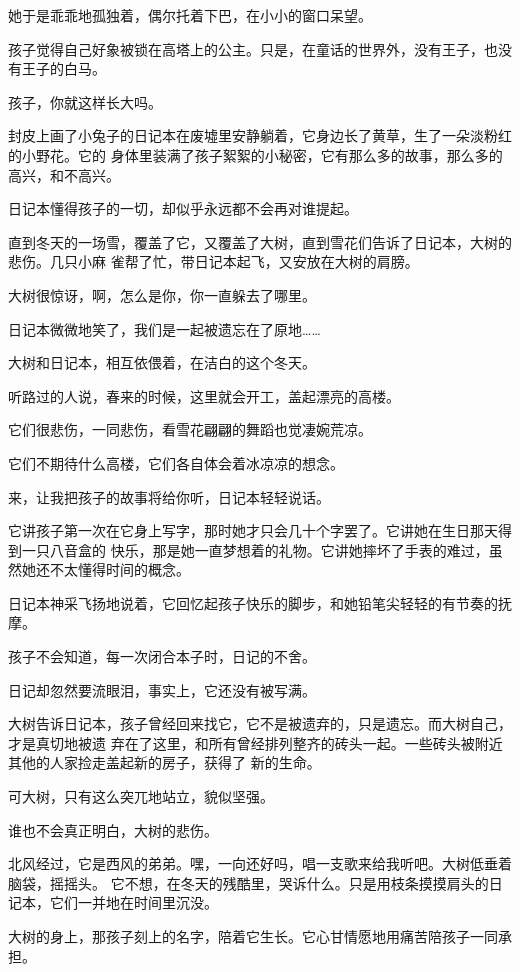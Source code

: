 		她于是乖乖地孤独着，偶尔托着下巴，在小小的窗口呆望。

		孩子觉得自己好象被锁在高塔上的公主。只是，在童话的世界外，没有王子，也没有王子的白马。


		孩子，你就这样长大吗。

		封皮上画了小兔子的日记本在废墟里安静躺着，它身边长了黄草，生了一朵淡粉红的小野花。它的
	身体里装满了孩子絮絮的小秘密，它有那么多的故事，那么多的高兴，和不高兴。

		日记本懂得孩子的一切，却似乎永远都不会再对谁提起。

		直到冬天的一场雪，覆盖了它，又覆盖了大树，直到雪花们告诉了日记本，大树的悲伤。几只小麻
	雀帮了忙，带日记本起飞，又安放在大树的肩膀。

		大树很惊讶，啊，怎么是你，你一直躲去了哪里。

		日记本微微地笑了，我们是一起被遗忘在了原地……

		大树和日记本，相互依偎着，在洁白的这个冬天。

		听路过的人说，春来的时候，这里就会开工，盖起漂亮的高楼。


		它们很悲伤，一同悲伤，看雪花翩翩的舞蹈也觉凄婉荒凉。

		它们不期待什么高楼，它们各自体会着冰凉凉的想念。


		来，让我把孩子的故事将给你听，日记本轻轻说话。

		它讲孩子第一次在它身上写字，那时她才只会几十个字罢了。它讲她在生日那天得到一只八音盒的
	快乐，那是她一直梦想着的礼物。它讲她摔坏了手表的难过，虽然她还不太懂得时间的概念。

		日记本神采飞扬地说着，它回忆起孩子快乐的脚步，和她铅笔尖轻轻的有节奏的抚摩。

		孩子不会知道，每一次闭合本子时，日记的不舍。

		日记却忽然要流眼泪，事实上，它还没有被写满。

		大树告诉日记本，孩子曾经回来找它，它不是被遗弃的，只是遗忘。而大树自己，才是真切地被遗
	弃在了这里，和所有曾经排列整齐的砖头一起。一些砖头被附近其他的人家捡走盖起新的房子，获得了
	新的生命。

		可大树，只有这么突兀地站立，貌似坚强。

		谁也不会真正明白，大树的悲伤。


		北风经过，它是西风的弟弟。嘿，一向还好吗，唱一支歌来给我听吧。大树低垂着脑袋，摇摇头。
	它不想，在冬天的残酷里，哭诉什么。只是用枝条摸摸肩头的日记本，它们一并地在时间里沉没。

		大树的身上，那孩子刻上的名字，陪着它生长。它心甘情愿地用痛苦陪孩子一同承担。

